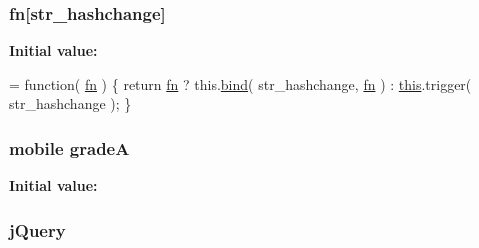 \hypertarget{jquery_8mobile-1_83_81_8js_a070a098c013c19f1fbe3cec06e21420f}{
\subsubsection[{fn}]{\setlength{\rightskip}{0pt plus 5cm}fn\mbox{[}str\+\_\+hashchange\mbox{]}}}\label{jquery_8mobile-1_83_81_8js_a070a098c013c19f1fbe3cec06e21420f}
{\bfseries Initial value\+:}
\begin{DoxyCode}
= \textcolor{keyword}{function}( \hyperlink{jquery_8mobile-1_83_81_8js_a070a098c013c19f1fbe3cec06e21420f}{fn} ) \{
    \textcolor{keywordflow}{return} \hyperlink{jquery_8mobile-1_83_81_8js_a070a098c013c19f1fbe3cec06e21420f}{fn} ? this.\hyperlink{jquery_8mobile-1_83_81_8js_aa28c4555fcf1f84917a1d70644f7174f}{bind}( str\_hashchange, \hyperlink{jquery_8mobile-1_83_81_8js_a070a098c013c19f1fbe3cec06e21420f}{fn} ) : \hyperlink{jquery_8mobile-1_83_81_8js_a05c09a5e9d53fa7adf0a7936038c2fa3}{this}.trigger( str\_hashchange );
  \}
\end{DoxyCode}
\hypertarget{jquery_8mobile-1_83_81_8js_a3831d815d58027c664811e749e51021d}{
\subsubsection[{grade\+A}]{\setlength{\rightskip}{0pt plus 5cm}mobile grade\+A}}\label{jquery_8mobile-1_83_81_8js_a3831d815d58027c664811e749e51021d}
{\bfseries Initial value\+:}
\hypertarget{jquery_8mobile-1_83_81_8js_a2b1d6f9c448e3ce72f4e1865d6e38d2c}{
\subsubsection[{j\+Query}]{\setlength{\rightskip}{0pt plus 5cm}j\+Query}}\label{jquery_8mobile-1_83_81_8js_a2b1d6f9c448e3ce72f4e1865d6e38d2c}
